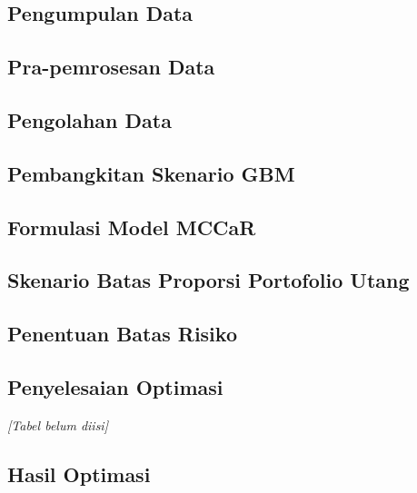         \subsection{Pengumpulan Data}\label{subsec:data collection}
        \subsection{Pra-pemrosesan Data}\label{subsec:preprocessing}
        \subsection{Pengolahan Data}\label{subsec:processing}
        \subsection{Pembangkitan Skenario GBM}\label{subsec:scenario generation}
        \subsection{Formulasi Model MCCaR}\label{subsec:model formulation}
        \subsection{Skenario Batas Proporsi Portofolio Utang}\label{subsec:boundary scenarios}
        \subsection{Penentuan Batas Risiko}\label{subsec:risk limit determination}
        \subsection{Penyelesaian Optimasi}\label{subsec:solving}

            \begin{table}[H]
                \centering
                \caption{Parameter utama eksperimen}\label{tab:main parameters}
                \textit{[Tabel belum diisi]}
            \end{table}

        \subsection{Hasil Optimasi}\label{subsec:optimization output}
